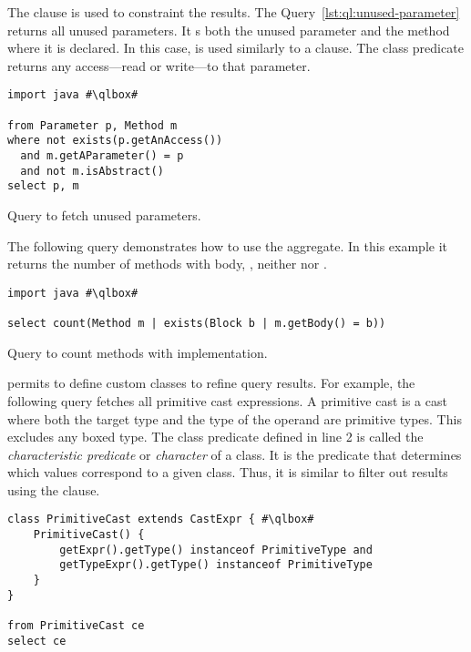 The  clause is used to constraint the results.
The Query~\ref{lst:ql:unused-parameter} returns all unused parameters.
It s both the unused parameter and the method where it is declared.
In this case,  is used similarly to a \sql{}  clause.
The  class predicate returns any access---read or write---to that parameter.

\begin{listing}
\begin{verbatim}
import java #\qlbox#

from Parameter p, Method m
where not exists(p.getAnAccess())
  and m.getAParameter() = p
  and not m.isAbstract()
select p, m
\end{verbatim}
\caption{Query to fetch unused parameters.}
\label{lst:ql:unused-parameter}
\end{listing}


The following query demonstrates how to use the  aggregate.
In this example it returns the number of methods with body,
\ie{}, neither  nor .

\begin{listing}
\begin{verbatim}
import java #\qlbox#

select count(Method m | exists(Block b | m.getBody() = b))
\end{verbatim}
\caption{Query to count methods with implementation.}
\label{lst:ql:count}
\end{listing}

\ql{} permits to define custom classes to refine query results. 
For example, the following query fetches all primitive cast expressions.
A primitive cast is a cast where both the target type and the type of the operand are primitive types.
This excludes any boxed type.
The class predicate defined in line 2 is called the \emph{characteristic predicate} or \emph{character} of a class.
It is the predicate that determines which values correspond to a given class.
Thus, it is similar to filter out results using the  clause.

\begin{listing}
\begin{verbatim}
class PrimitiveCast extends CastExpr { #\qlbox#
	PrimitiveCast() {
		getExpr().getType() instanceof PrimitiveType and
		getTypeExpr().getType() instanceof PrimitiveType
	}
}

from PrimitiveCast ce
select ce
\end{verbatim}
\end{listing}

